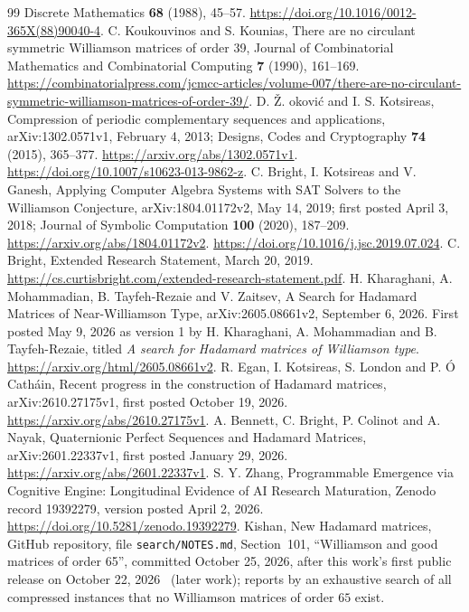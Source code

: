 \documentclass[11pt]{article}
\begin{document}
\begin{thebibliography}{99}
Discrete Mathematics \textbf{68} (1988), 45--57.
\url{https://doi.org/10.1016/0012-365X(88)90040-4}.
C. Koukouvinos and S. Kounias, There are no circulant symmetric Williamson
matrices of order 39, Journal of Combinatorial Mathematics and
Combinatorial Computing \textbf{7} (1990), 161--169.
\url{https://combinatorialpress.com/jcmcc-articles/volume-007/there-are-no-circulant-symmetric-williamson-matrices-of-order-39/}.
D. \v Z. \DJ okovi\'c and I. S. Kotsireas,
Compression of periodic complementary sequences and applications,
arXiv:1302.0571v1, February 4, 2013;
Designs, Codes and Cryptography \textbf{74} (2015), 365--377.
\url{https://arxiv.org/abs/1302.0571v1}.
\url{https://doi.org/10.1007/s10623-013-9862-z}.
C. Bright, I. Kotsireas and V. Ganesh,
Applying Computer Algebra Systems with SAT Solvers to the Williamson
Conjecture, arXiv:1804.01172v2, May 14, 2019; first posted April 3, 2018;
Journal of Symbolic Computation \textbf{100} (2020), 187--209.
\url{https://arxiv.org/abs/1804.01172v2}.
\url{https://doi.org/10.1016/j.jsc.2019.07.024}.
C. Bright, Extended Research Statement, March 20, 2019.
\url{https://cs.curtisbright.com/extended-research-statement.pdf}.
H. Kharaghani, A. Mohammadian, B. Tayfeh-Rezaie and V. Zaitsev,
A Search for Hadamard Matrices of Near-Williamson Type,
arXiv:2605.08661v2, September 6, 2026.
First posted May 9, 2026 as version 1 by H. Kharaghani, A. Mohammadian
and B. Tayfeh-Rezaie, titled \emph{A search for Hadamard matrices of Williamson type}.
\url{https://arxiv.org/html/2605.08661v2}.
R. Egan, I. Kotsireas, S. London and P. \'O Cath\'ain,
Recent progress in the construction of Hadamard matrices,
arXiv:2610.27175v1, first posted October 19, 2026.
\url{https://arxiv.org/abs/2610.27175v1}.
A. Bennett, C. Bright, P. Colinot and A. Nayak,
Quaternionic Perfect Sequences and Hadamard Matrices,
arXiv:2601.22337v1, first posted January 29, 2026.
\url{https://arxiv.org/abs/2601.22337v1}.
S. Y. Zhang, Programmable Emergence via Cognitive Engine: Longitudinal
Evidence of AI Research Maturation, Zenodo record 19392279, version posted April 2, 2026.
\url{https://doi.org/10.5281/zenodo.19392279}.
Kishan, New Hadamard matrices, GitHub repository, file
\texttt{search/NOTES.md}, Section~101, ``Williamson and good matrices of
order 65'', committed October 25, 2026, after this work's first public
release on October 22, 2026~\cite{v1} (later work); reports by an exhaustive search
of all compressed instances that no Williamson matrices of order $65$ exist.

\end{thebibliography}
\end{document}
